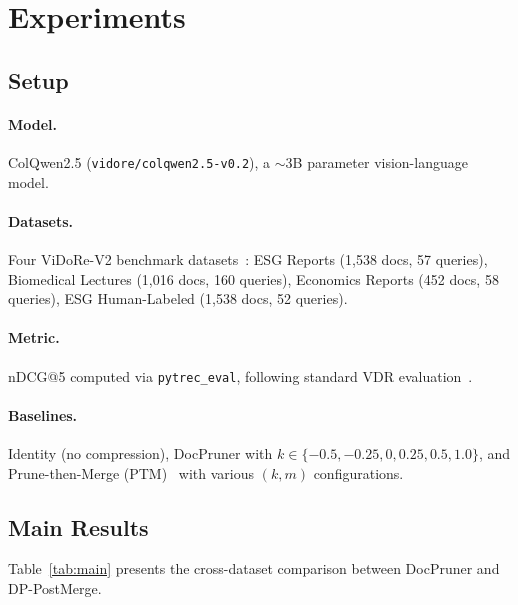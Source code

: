 \documentclass[11pt]{article}
\begin{document}
\section{Experiments}

\subsection{Setup}

\paragraph{Model.}
ColQwen2.5 (\texttt{vidore/colqwen2.5-v0.2}), a $\sim$3B parameter vision-language model.

\paragraph{Datasets.}
Four ViDoRe-V2 benchmark datasets~\cite{mace2025vidorev2}:
ESG Reports (1,538 docs, 57 queries),
Biomedical Lectures (1,016 docs, 160 queries),
Economics Reports (452 docs, 58 queries),
ESG Human-Labeled (1,538 docs, 52 queries).

\paragraph{Metric.}
nDCG@5 computed via \texttt{pytrec\_eval}, following standard VDR evaluation~\cite{faysse2024colpali}.

\paragraph{Baselines.}
Identity (no compression), DocPruner with $k \in \{-0.5, -0.25, 0, 0.25, 0.5, 1.0\}$, and Prune-then-Merge (PTM)~\cite{yan2026ptm} with various $(k, m)$ configurations.

\subsection{Main Results}

Table~\ref{tab:main} presents the cross-dataset comparison between DocPruner and DP-PostMerge.
\end{document}
